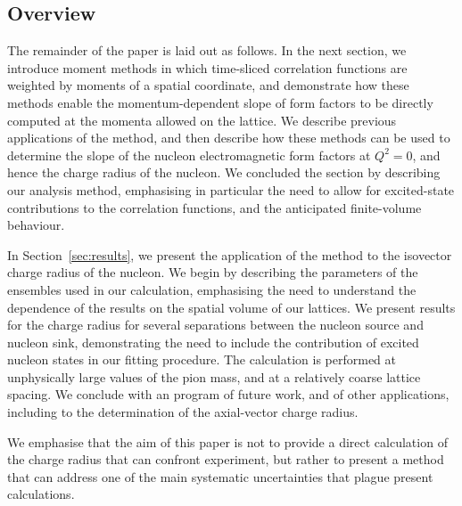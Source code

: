 \documentclass[prd,aps,twocolumn,superscriptaddress,tightenlines,nofootinbib,floatfix,preprintnumbers,10pt]{revtex4-1}
\begin{document}
\subsection{Overview}

The remainder of the paper is laid out as follows.  In the next
section, we introduce moment methods in which time-sliced
correlation functions are weighted by moments of a spatial coordinate,
and demonstrate how these methods enable the momentum-dependent slope of form factors to
be directly computed at the momenta allowed on the lattice.  We
describe previous applications of the method, and then describe how
these methods can be used to determine the slope of the nucleon
electromagnetic form factors at $Q^2 = 0$, and hence the charge radius
of the nucleon.  We concluded the section by describing our analysis
method, emphasising in particular the need to allow for excited-state
contributions to the correlation functions, and the anticipated
finite-volume behaviour.

In Section~\ref{sec:results}, we present the application of the method
to the isovector charge radius of the nucleon.  We begin by describing
the parameters of the ensembles used in our calculation, emphasising
the need to understand the dependence of the results on the spatial
volume of our lattices.  We present results for the charge radius for
several separations between the nucleon source and nucleon sink,
demonstrating the need to include the contribution of excited nucleon
states in our fitting procedure.  The calculation is performed at
unphysically large values of the pion mass, and at a relatively coarse
lattice spacing.  We conclude with an program of future work, and of
other applications, including to the determination of the axial-vector
charge radius.

We emphasise that the aim of this paper is not to provide a direct
calculation of the charge radius that can confront experiment, but
rather to present a method that can address one of the main systematic
uncertainties that plague present calculations.
\end{document}
